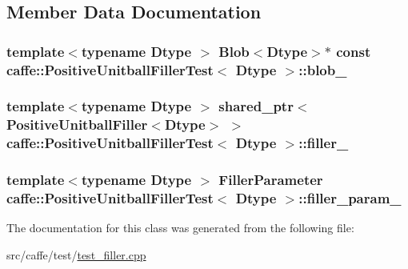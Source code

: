 \subsection{Member Data Documentation}
\hypertarget{classcaffe_1_1_positive_unitball_filler_test_af19629fd3bf030416e99fb99560cc66f}{
\subsubsection[{blob\+\_\+}]{\setlength{\rightskip}{0pt plus 5cm}template$<$typename Dtype $>$ {\bf Blob}$<$Dtype$>$$\ast$ const {\bf caffe\+::\+Positive\+Unitball\+Filler\+Test}$<$ Dtype $>$\+::blob\+\_\+\hspace{0.3cm}{\ttfamily [protected]}}}\label{classcaffe_1_1_positive_unitball_filler_test_af19629fd3bf030416e99fb99560cc66f}
\hypertarget{classcaffe_1_1_positive_unitball_filler_test_ad3ebaf3b06c5ec22019b0e29c50b1dd5}{
\subsubsection[{filler\+\_\+}]{\setlength{\rightskip}{0pt plus 5cm}template$<$typename Dtype $>$ shared\+\_\+ptr$<${\bf Positive\+Unitball\+Filler}$<$Dtype$>$ $>$ {\bf caffe\+::\+Positive\+Unitball\+Filler\+Test}$<$ Dtype $>$\+::filler\+\_\+\hspace{0.3cm}{\ttfamily [protected]}}}\label{classcaffe_1_1_positive_unitball_filler_test_ad3ebaf3b06c5ec22019b0e29c50b1dd5}
\hypertarget{classcaffe_1_1_positive_unitball_filler_test_ab669b2aa9520fc63000ce297306376b5}{
\subsubsection[{filler\+\_\+param\+\_\+}]{\setlength{\rightskip}{0pt plus 5cm}template$<$typename Dtype $>$ Filler\+Parameter {\bf caffe\+::\+Positive\+Unitball\+Filler\+Test}$<$ Dtype $>$\+::filler\+\_\+param\+\_\+\hspace{0.3cm}{\ttfamily [protected]}}}\label{classcaffe_1_1_positive_unitball_filler_test_ab669b2aa9520fc63000ce297306376b5}


The documentation for this class was generated from the following file\+:\begin{DoxyCompactItemize}
\item 
src/caffe/test/\hyperlink{test__filler_8cpp}{test\+\_\+filler.\+cpp}\end{DoxyCompactItemize}
